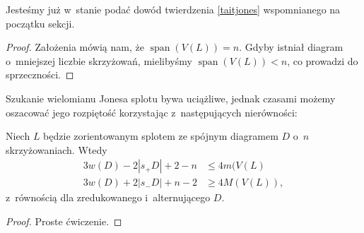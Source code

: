 Jesteśmy już w~stanie podać dowód twierdzenia \ref{taitjones} wspomnianego na początku sekcji.

\begin{proof}
    Założenia mówią nam, że $\operatorname{span} (V(L)) = n$.
    Gdyby istniał diagram o~mniejszej liczbie skrzyżowań,
    mielibyśmy $\operatorname{span} (V(L)) < n$, co prowadzi do sprzeczności.
\end{proof}

Szukanie wielomianu Jonesa splotu bywa uciążliwe,
jednak czasami możemy oszacować jego rozpiętość korzystając z~następujących nierówności:

\begin{corollary}
    Niech $L$ będzie zorientowanym splotem ze spójnym diagramem $D$ o~$n$ skrzyżowaniach.
    Wtedy
    \begin{align*}
        3w(D)-2|s_+D|+2-n & \le 4 m(V(L) \\
        3w(D)+2|s_-D|+n-2 & \ge 4 M(V(L)),
    \end{align*}
    z~równością dla zredukowanego i~alternującego $D$.
\end{corollary}

\begin{proof}
    Proste ćwiczenie.
\end{proof}

